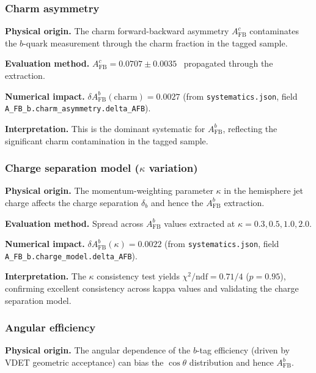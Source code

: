 \documentclass[11pt,a4paper]{article}
\begin{document}
\subsubsection{Charm asymmetry}
\label{sec:syst_charm_asym}

\textbf{Physical origin.} The charm forward-backward asymmetry $A_\mathrm{FB}^c$ contaminates
the $b$-quark measurement through the charm fraction in the tagged sample.

\textbf{Evaluation method.} $A_\mathrm{FB}^c = 0.0707 \pm 0.0035$~\cite{LEP:EWWG:2005}
propagated through the extraction.

\textbf{Numerical impact.}
$\delta A_\mathrm{FB}^b(\mathrm{charm}) = 0.0027$
(from \texttt{systematics.json}, field \texttt{A\_FB\_b.charm\_asymmetry.delta\_AFB}).

\textbf{Interpretation.} This is the dominant systematic for $A_\mathrm{FB}^b$,
reflecting the significant charm contamination in the tagged sample.

\subsubsection{Charge separation model ($\kappa$ variation)}
\label{sec:syst_kappa}

\textbf{Physical origin.} The momentum-weighting parameter $\kappa$ in the hemisphere
jet charge affects the charge separation $\delta_b$ and hence the $A_\mathrm{FB}^b$ extraction.

\textbf{Evaluation method.} Spread across $A_\mathrm{FB}^b$ values extracted at
$\kappa = 0.3, 0.5, 1.0, 2.0$.

\textbf{Numerical impact.}
$\delta A_\mathrm{FB}^b(\kappa) = 0.0022$
(from \texttt{systematics.json}, field \texttt{A\_FB\_b.charge\_model.delta\_AFB}).

\textbf{Interpretation.} The $\kappa$ consistency test yields $\chi^2/\mathrm{ndf} = 0.71/4$
($p = 0.95$), confirming excellent consistency across kappa values and validating the
charge separation model.

\subsubsection{Angular efficiency}
\label{sec:syst_angular}

\textbf{Physical origin.} The angular dependence of the $b$-tag efficiency (driven by
VDET geometric acceptance) can bias the $\cos\theta$ distribution and hence $A_\mathrm{FB}^b$.
\end{document}
